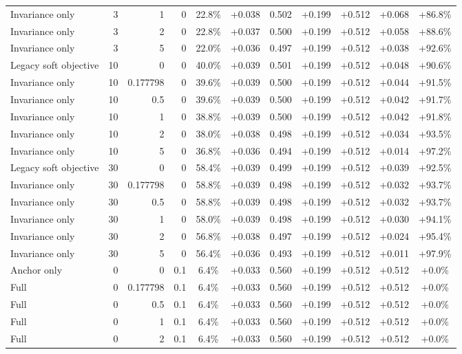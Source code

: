 \begin{table}[htbp]
\begin{tabular}{lrrrccccccc}
Invariance only & 3 & 1 & 0 & 22.8\% & +0.038 & 0.502 & +0.199 & +0.512 & +0.068 & +86.8\% \\
Invariance only & 3 & 2 & 0 & 22.8\% & +0.037 & 0.500 & +0.199 & +0.512 & +0.058 & +88.6\% \\
Invariance only & 3 & 5 & 0 & 22.0\% & +0.036 & 0.497 & +0.199 & +0.512 & +0.038 & +92.6\% \\
Legacy soft objective & 10 & 0 & 0 & 40.0\% & +0.039 & 0.501 & +0.199 & +0.512 & +0.048 & +90.6\% \\
Invariance only & 10 & 0.177798 & 0 & 39.6\% & +0.039 & 0.500 & +0.199 & +0.512 & +0.044 & +91.5\% \\
Invariance only & 10 & 0.5 & 0 & 39.6\% & +0.039 & 0.500 & +0.199 & +0.512 & +0.042 & +91.7\% \\
Invariance only & 10 & 1 & 0 & 38.8\% & +0.039 & 0.500 & +0.199 & +0.512 & +0.042 & +91.8\% \\
Invariance only & 10 & 2 & 0 & 38.0\% & +0.038 & 0.498 & +0.199 & +0.512 & +0.034 & +93.5\% \\
Invariance only & 10 & 5 & 0 & 36.8\% & +0.036 & 0.494 & +0.199 & +0.512 & +0.014 & +97.2\% \\
Legacy soft objective & 30 & 0 & 0 & 58.4\% & +0.039 & 0.499 & +0.199 & +0.512 & +0.039 & +92.5\% \\
Invariance only & 30 & 0.177798 & 0 & 58.8\% & +0.039 & 0.498 & +0.199 & +0.512 & +0.032 & +93.7\% \\
Invariance only & 30 & 0.5 & 0 & 58.8\% & +0.039 & 0.498 & +0.199 & +0.512 & +0.032 & +93.7\% \\
Invariance only & 30 & 1 & 0 & 58.0\% & +0.039 & 0.498 & +0.199 & +0.512 & +0.030 & +94.1\% \\
Invariance only & 30 & 2 & 0 & 56.8\% & +0.038 & 0.497 & +0.199 & +0.512 & +0.024 & +95.4\% \\
Invariance only & 30 & 5 & 0 & 56.4\% & +0.036 & 0.493 & +0.199 & +0.512 & +0.011 & +97.9\% \\
Anchor only & 0 & 0 & 0.1 & 6.4\% & +0.033 & 0.560 & +0.199 & +0.512 & +0.512 & +0.0\% \\
Full & 0 & 0.177798 & 0.1 & 6.4\% & +0.033 & 0.560 & +0.199 & +0.512 & +0.512 & +0.0\% \\
Full & 0 & 0.5 & 0.1 & 6.4\% & +0.033 & 0.560 & +0.199 & +0.512 & +0.512 & +0.0\% \\
Full & 0 & 1 & 0.1 & 6.4\% & +0.033 & 0.560 & +0.199 & +0.512 & +0.512 & +0.0\% \\
Full & 0 & 2 & 0.1 & 6.4\% & +0.033 & 0.560 & +0.199 & +0.512 & +0.512 & +0.0\% \\

\end{tabular}
\end{table}
